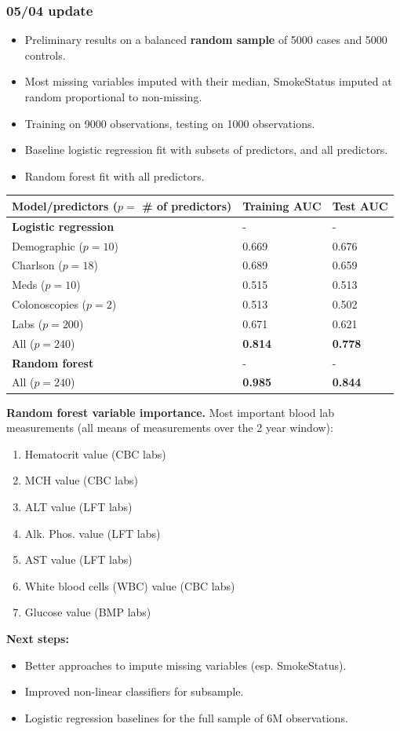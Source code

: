\documentclass[12pt]{article}
\begin{document}
\subsubsection*{05/04 update}
\begin{itemize}
  \item Preliminary results on a balanced {\bf random sample} of 5000 cases and 5000 controls.
  \item Most missing variables imputed with their median, SmokeStatus imputed at random proportional to non-missing. %
  \item Training on 9000 observations, testing on 1000 observations.
  \item Baseline logistic regression fit with subsets of predictors, and all predictors.
  \item Random forest fit with all predictors.
\end{itemize}
\begin{center}
\begin{tabular}{|l|l|l|}
\hline
\textbf{Model/predictors ($p=$ \# of predictors)} & \textbf{Training AUC} & \textbf{Test AUC} \\ \hline
{\bf Logistic regression} & - & - \\ \hline
Demographic ($p=10$) & 0.669 & 0.676 \\ \hline
Charlson ($p=18$) & 0.689 & 0.659 \\ \hline
Meds ($p=10$) & 0.515 & 0.513 \\ \hline
Colonoscopies ($p=2$) & 0.513 & 0.502 \\ \hline
Labs ($p=200$) & 0.671 & 0.621 \\ \hline
All ($p=240$) & {\bf 0.814} & {\bf 0.778} \\ \hline
{\bf Random forest} & - & - \\ \hline
All ($p=240$) & {\bf 0.985} & {\bf 0.844} \\ \hline
\end{tabular}
\end{center}
{\bf Random forest variable importance.}
Most important blood lab measurements (all means of measurements over the 2 year window):
\begin{enumerate}
  \item Hematocrit value (CBC labs)
  \item MCH value (CBC labs)
  \item ALT value (LFT labs)
  \item Alk. Phos. value (LFT labs)
  \item AST value (LFT labs)
  \item White blood cells (WBC) value (CBC labs)
  \item Glucose value (BMP labs)
\end{enumerate}
{\bf Next steps:}
\begin{itemize}
  \item Better approaches to impute missing variables (esp. SmokeStatus).
  \item Improved non-linear classifiers for subsample.
  \item Logistic regression baselines for the full sample of 6M observations.
\end{itemize}
\end{document}
